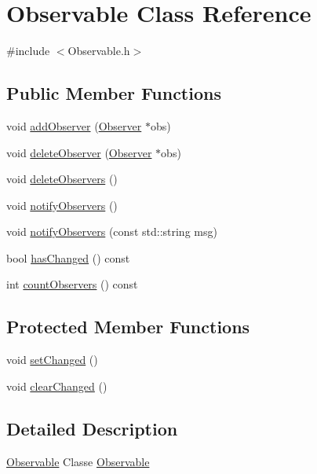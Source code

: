 \hypertarget{classObservable}{}\section{Observable Class Reference}
\label{classObservable}


{\ttfamily \#include $<$Observable.\+h$>$}

\subsection*{Public Member Functions}
\begin{DoxyCompactItemize}
\item 
void \hyperlink{classObservable_af851f0a4c61f2acce7a270f774ad5cfb}{add\+Observer} (\hyperlink{classObserver}{Observer} $\ast$obs)
\item 
void \hyperlink{classObservable_abf78cf600c4ee7f53d3f304a45a99997}{delete\+Observer} (\hyperlink{classObserver}{Observer} $\ast$obs)
\item 
void \hyperlink{classObservable_a58d44b0ffda7a756d543f819028a65ed}{delete\+Observers} ()
\item 
void \hyperlink{classObservable_ad88b0ad8e623c5450ac3857daeb1c330}{notify\+Observers} ()
\item 
void \hyperlink{classObservable_a4d40c0f80343cd4fe27ab195e11e9d71}{notify\+Observers} (const std\+::string msg)
\item 
bool \hyperlink{classObservable_a47d67f961b4668f8cb69e6017d5534c1}{has\+Changed} () const
\item 
int \hyperlink{classObservable_a86a88f7a9d862e6dd192c76eb042cff1}{count\+Observers} () const
\end{DoxyCompactItemize}
\subsection*{Protected Member Functions}
\begin{DoxyCompactItemize}
\item 
void \hyperlink{classObservable_a7041841fb1de932dd6677ae273b3bb9a}{set\+Changed} ()
\item 
void \hyperlink{classObservable_a98b488f7ef648cf1da2c8bac7f0cce26}{clear\+Changed} ()
\end{DoxyCompactItemize}


\subsection{Detailed Description}
\hyperlink{classObservable}{Observable} Classe \hyperlink{classObservable}{Observable} 


